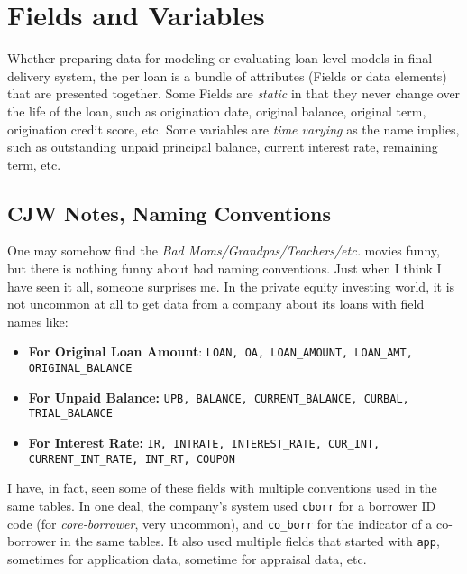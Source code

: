\documentclass[10pt]{article}
\begin{document}
\section{Fields and Variables}

Whether preparing data for modeling or evaluating loan level models in final
delivery system, the  per loan is a bundle of attributes
(Fields or data elements) that are presented together.  
Some Fields are {\em static} in that they
never change over the life of the loan, such as origination date, original
balance, original term, origination credit score, etc.  Some variables are {\em
time varying} as the name implies, such as outstanding unpaid principal
balance, current interest rate, remaining term, etc.

\ifcommentary

\subsection{CJW Notes, Naming Conventions}

One may somehow find the {\em Bad Moms/Grandpas/Teachers/etc.} movies funny, but there is nothing funny about bad naming conventions.  
Just when I think I have seen it all, someone surprises me.   In the private equity investing world, it is not uncommon 
at all to get data from a company about its loans with field names like: 
\begin{itemize}
    \item {\bf For Original Loan Amount}: {\tt LOAN, OA, LOAN\_AMOUNT, LOAN\_AMT, ORIGINAL\_BALANCE}
    \item {\bf For Unpaid Balance:} {\tt UPB, BALANCE, CURRENT\_BALANCE, CURBAL, TRIAL\_BALANCE}
    \item {\bf For Interest Rate:} {\tt IR, INTRATE, INTEREST\_RATE, CUR\_INT, CURRENT\_INT\_RATE, INT\_RT, COUPON}
\end{itemize}
I have, in fact, seen some of these fields with multiple conventions used in the same tables.  
In one deal, the company's system used {\tt cborr} for a borrower ID code (for {\em core-borrower}, very uncommon), 
and {\tt co\_borr} for the indicator of a co-borrower in the same tables. It also used multiple fields that started with {\tt app},
sometimes for application data, sometime for appraisal data, etc.
\end{document}
